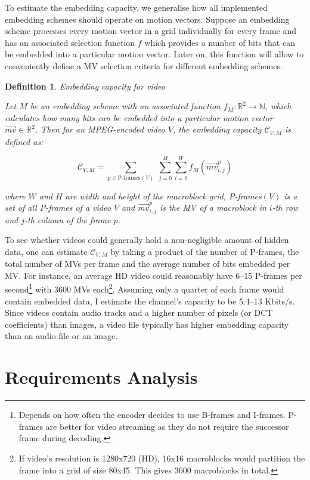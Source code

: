 \documentclass[12pt,british,twoside,notitlepage,usenames,dvipsnames,hypens,final]{report}
\newtheorem{definition}{Definition}
\numberwithin{equation}{section}
\numberwithin{figure}{section}
\begin{document}
To estimate the embedding capacity, we generalise how all implemented embedding schemes should operate on motion vectors. Suppose an embedding scheme processes every motion vector in a grid individually for every frame and has an associated selection function $f$ which provides a number of bits that can be embedded into a particular motion vector. Later on, this function will allow to conveniently define a MV selection criteria for different embedding schemes.

\begin{definition}{Embedding capacity for video}

Let $M$ be an embedding scheme with an associated function $f_M : \mathbb{R}^2 \rightarrow \mathbb{N}$, which calculates how many bits can be embedded into a particular motion vector $\overrightarrow{mv} \in \mathbb{R}^2$. Then for an MPEG-encoded video $V$, the embedding capacity $\mathcal{C}_{V, M}$ is defined as:

$$ \mathcal{C}_{V, M} = \sum_{p \in \text{P-frames}(V)} \: \sum^{H}_{j = 0} \sum^{W}_{i = 0} f_M(\overrightarrow{mv}^p_{i, j})$$

where $W$ and $H$ are width and height of the macroblock grid, P-frames$(V)$ is a set of all P-frames of a video $V$ and $\overrightarrow{mv}^p_{i, j}$ is the MV of a macroblock  in $i$-th row and $j$-th column of the frame $p$.

\end{definition}

To see whether videos could generally hold a non-negligible amount of hidden data, one can estimate $\mathcal{C}_{V, M}$ by taking a product of the number of P-frames, the total number of MVs per frame and the average number of bits embedded per MV. For instance, an average HD video could reasonably have 6--15 P-frames per second\footnote{Depends on how often the encoder decides to use B-frames and I-frames. P-frames are better for video streaming as they do not require the successor frame during decoding.} with 3600 MVs each\footnote{If video's resolution is 1280x720 (HD), 16x16 macroblocks would partition the frame into a grid of size 80x45. This gives 3600 macroblocks in total.}. Assuming only a quarter of each frame would contain embedded data, I estimate the channel's capacity to be 5.4--13 Kbits/s. Since videos contain audio tracks and a higher number of pixels (or DCT coefficients) than images, a video file typically has higher embedding capacity than an audio file or an image.

\section{Requirements Analysis}
\end{document}
